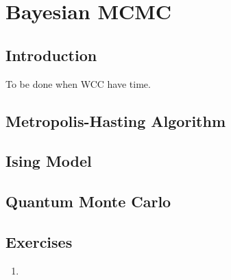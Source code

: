 \chapter{Bayesian MCMC}
\label{chp:mcmc}



\section{Introduction}

To be done when WCC have time.



\section{Metropolis-Hasting Algorithm}




\section{Ising Model}




\section{Quantum Monte Carlo}




\section{Exercises}
\label{sec:mle_exercise}

\begin{enumerate}[label=\thechapter-\arabic*]

\item


\end{enumerate}

